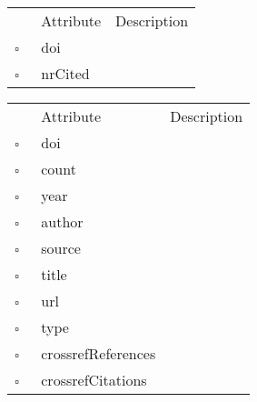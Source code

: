 \begin{table}
\caption{MissingCitingWork  }

\begin{longtable}{llp{8cm}}
& Attribute & Description \\
$\square$\ & doi &  \\
$\square$\ & nrCited &  \\
\end{longtable}
\label{attr:MissingCitingWork}
\end{table}

\clearpage
\begin{table}
\caption{MissingCross  }

\begin{longtable}{llp{8cm}}
& Attribute & Description \\
$\square$\ & doi &  \\
$\square$\ & count &  \\
$\square$\ & year &  \\
$\square$\ & author &  \\
$\square$\ & source &  \\
$\square$\ & title &  \\
$\square$\ & url &  \\
$\square$\ & type &  \\
$\square$\ & crossrefReferences &  \\
$\square$\ & crossrefCitations &  \\
\end{longtable}
\label{attr:MissingCross}
\end{table}

